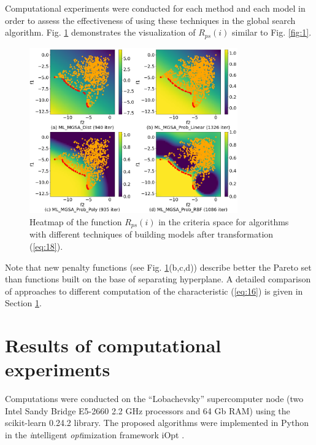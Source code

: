 \documentclass[runningheads]{llncs}
\begin{document}
Computational experiments were conducted for each method and each model in order to assess the effectiveness of using these techniques in the global search algorithm. Fig. \ref{fig:2} demonstrates the visualization of $R_{ps}(i)$ similar to Fig. \ref{fig:1}.
\begin{figure}
\centering
\includegraphics[width=0.8\textwidth]{fig2.png}
\caption{Heatmap of the function $R_{ps}(i)$ in the criteria space for algorithms with different techniques of building models after transformation (\ref{eq:18}).} 
\label{fig:2}
\end{figure}

Note that new penalty functions (see Fig. \ref{fig:2}(b,c,d)) describe better the Pareto set than functions built on the base of separating hyperplane. A detailed comparison of approaches to different computation of the characteristic (\ref{eq:16}) is given in Section \ref{sec:5}. 

\section{Results of computational experiments}
\label{sec:5}

Computations were conducted on the ``Lobachevsky'' supercomputer node (two Intel Sandy Bridge E5-2660 2.2 GHz processors and 64 Gb RAM) using the scikit-learn 0.24.2 library.
The proposed algorithms were implemented in Python in the \textit{i}ntelligent \textit{opt}imization framework iOpt \cite{iOpt_url}.


\end{document}
